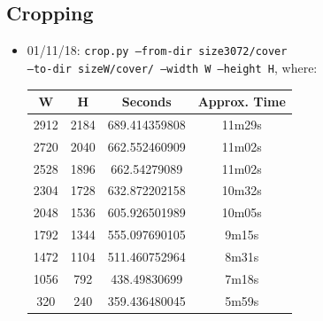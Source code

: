 \documentclass[11pt,a4paper]{report}
\begin{document}
\subsection{Cropping}
\begin{itemize}
\item 01/11/18: \texttt{crop.py --from-dir size3072/cover} \\
         \texttt{--to-dir sizeW/cover/ --width W --height H}, where:
  \begin{center}
  \begin{tabular}{ c c | c c }
  W & H & Seconds & Approx. Time\\ \hline
  2912 & 2184 & 689.414359808 & 11m29s \\
  2720 & 2040 & 662.552460909 & 11m02s \\
  2528 & 1896 & 662.54279089 & 11m02s \\
  2304 & 1728 & 632.872202158 & 10m32s \\
  2048 & 1536 & 605.926501989 & 10m05s \\
  1792 & 1344 & 555.097690105 & 9m15s \\
  1472 & 1104 & 511.460752964 & 8m31s \\
  1056 & 792 & 438.49830699 & 7m18s \\
  320 & 240 & 359.436480045 & 5m59s \\
  \end{tabular}
  \end{center}
\end{itemize}
\end{document}
